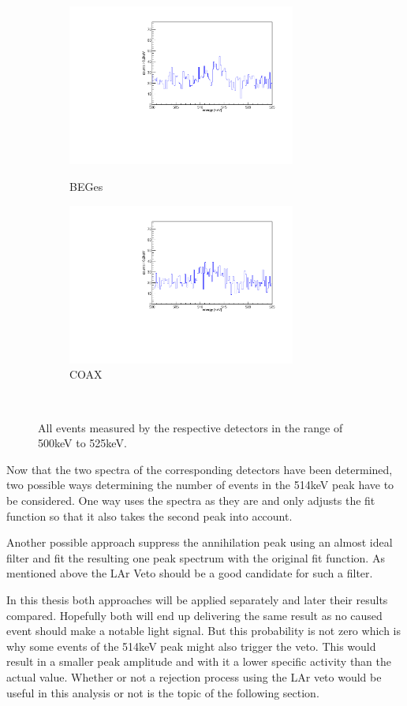 \documentclass[encoding=utf8,british]{tumphthesis}
\begin{document}
\begin{figure}[t!]
\centering
\begin{subfigure}{.5\textwidth}
  \centering
	\includegraphics[width=75mm]{./Bilder/500525NoFilterBEGes.pdf}
  \label{fig:NoFilterBEGes}
  \caption{BEGes}
\end{subfigure}%
\begin{subfigure}{.5\textwidth}
  \centering
	\includegraphics[width=75mm]{./Bilder/500525NoFilterCOAX.pdf}
  \caption{COAX}
  \label{fig:NoFilterCOAX}
\end{subfigure}
    \\
	\vspace{0.5cm}
	\caption{All events measured by the respective detectors in the range of 500keV to 525keV.}
\end{figure}

Now that the two spectra of the corresponding detectors have been determined, two possible ways determining the number of events in the 514keV peak have to be considered.
One way uses the spectra as they are and only adjusts the fit function so that it also takes the second peak into account.

Another possible approach suppress the annihilation peak using an almost ideal filter and fit the resulting one peak spectrum with the original fit function.
As mentioned above the LAr Veto should be a good candidate for such a filter.

In this thesis both approaches will be applied separately and later their results compared.
Hopefully both will end up delivering the same result as no \Kr caused event should make a notable light signal.
But this probability is not zero which is why some events of the 514keV peak might also trigger the veto.
This would result in a smaller peak amplitude and with it a lower specific activity than the actual value. 
Whether or not a rejection process using the LAr veto would be useful in this analysis or not is the topic of the following section.
\\
\end{document}

